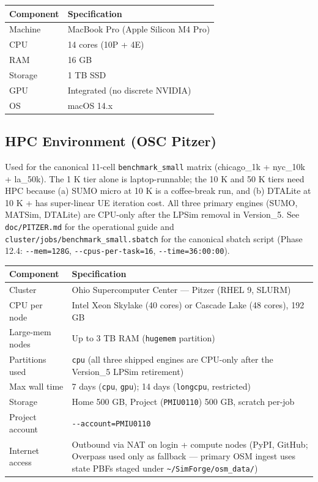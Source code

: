 \begin{longtable}[]{@{}ll@{}}
\toprule\noalign{}
Component & Specification \\
\midrule\noalign{}
\endhead
\bottomrule\noalign{}
\endlastfoot
Machine & MacBook Pro (Apple Silicon M4 Pro) \\
CPU & 14 cores (10P + 4E) \\
RAM & 16 GB \\
Storage & 1 TB SSD \\
GPU & Integrated (no discrete NVIDIA) \\
OS & macOS 14.x \\
\end{longtable}

\subsection{HPC Environment (OSC
Pitzer)}\label{432-hpc-environment-osc-pitzer}

Used for the canonical 11-cell \texttt{benchmark\_small} matrix
(chicago\_1k + nyc\_10k + la\_50k). The 1 K tier alone is
laptop-runnable; the 10 K and 50 K tiers need HPC because (a) SUMO micro
at 10 K is a coffee-break run, and (b) DTALite at 10 K + has
super-linear UE iteration cost. All three primary engines (SUMO, MATSim,
DTALite) are CPU-only after the LPSim removal in Version\_5. See
\texttt{doc/PITZER.md} for the operational guide and
\texttt{cluster/jobs/benchmark\_small.sbatch} for the canonical sbatch
script (Phase 12.4: \texttt{-\/-mem=128G},
\texttt{-\/-cpus-per-task=16}, \texttt{-\/-time=36:00:00}).

\begin{longtable}[]{@{}ll@{}}
\toprule\noalign{}
Component & Specification \\
\midrule\noalign{}
\endhead
\bottomrule\noalign{}
\endlastfoot
Cluster & Ohio Supercomputer Center --- Pitzer (RHEL 9, SLURM) \\
CPU per node & Intel Xeon Skylake (40 cores) or Cascade Lake (48 cores),
192 GB \\
Large-mem nodes & Up to 3 TB RAM (\texttt{hugemem} partition) \\
Partitions used & \texttt{cpu} (all three shipped engines are CPU-only
after the Version\_5 LPSim retirement) \\
Max wall time & 7 days (\texttt{cpu}, \texttt{gpu}); 14 days
(\texttt{longcpu}, restricted) \\
Storage & Home 500 GB, Project (\texttt{PMIU0110}) 500 GB, scratch
per-job \\
Project account & \texttt{-\/-account=PMIU0110} \\
Internet access & Outbound via NAT on login + compute nodes (PyPI,
GitHub; Overpass used only as fallback --- primary OSM ingest uses state
PBFs staged under \texttt{\textasciitilde{}/SimForge/osm\_data/}) \\
\end{longtable}


